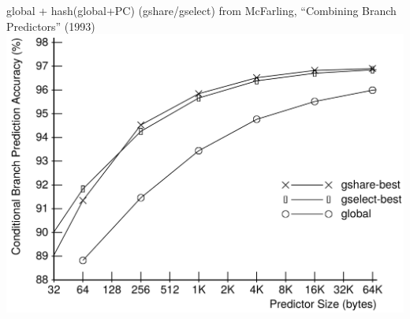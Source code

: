\begin{frame}{global + hash(global+PC) (gshare/gselect)}
from McFarling, ``Combining Branch Predictors'' (1993)
\includegraphics[height=0.8\textheight]{../bpred/mcf-global-gshare}
\end{frame}


